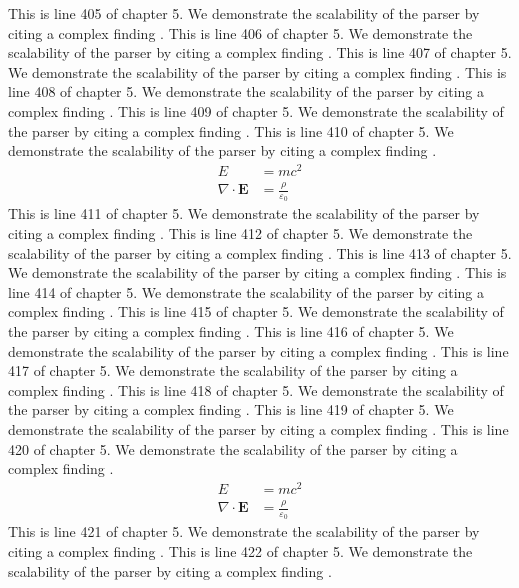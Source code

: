This is line 405 of chapter 5. We demonstrate the scalability of the parser by citing a complex finding \cite{ref5_405}.
This is line 406 of chapter 5. We demonstrate the scalability of the parser by citing a complex finding \cite{ref5_406}.
This is line 407 of chapter 5. We demonstrate the scalability of the parser by citing a complex finding \cite{ref5_407}.
This is line 408 of chapter 5. We demonstrate the scalability of the parser by citing a complex finding \cite{ref5_408}.
This is line 409 of chapter 5. We demonstrate the scalability of the parser by citing a complex finding \cite{ref5_409}.
This is line 410 of chapter 5. We demonstrate the scalability of the parser by citing a complex finding \cite{ref5_410}.
\begin{align*}
  E &= mc^2 \\
  \nabla \cdot \mathbf{E} &= \frac{\rho}{\varepsilon_0}
\end{align*}
This is line 411 of chapter 5. We demonstrate the scalability of the parser by citing a complex finding \cite{ref5_411}.
This is line 412 of chapter 5. We demonstrate the scalability of the parser by citing a complex finding \cite{ref5_412}.
This is line 413 of chapter 5. We demonstrate the scalability of the parser by citing a complex finding \cite{ref5_413}.
This is line 414 of chapter 5. We demonstrate the scalability of the parser by citing a complex finding \cite{ref5_414}.
This is line 415 of chapter 5. We demonstrate the scalability of the parser by citing a complex finding \cite{ref5_415}.
This is line 416 of chapter 5. We demonstrate the scalability of the parser by citing a complex finding \cite{ref5_416}.
This is line 417 of chapter 5. We demonstrate the scalability of the parser by citing a complex finding \cite{ref5_417}.
This is line 418 of chapter 5. We demonstrate the scalability of the parser by citing a complex finding \cite{ref5_418}.
This is line 419 of chapter 5. We demonstrate the scalability of the parser by citing a complex finding \cite{ref5_419}.
This is line 420 of chapter 5. We demonstrate the scalability of the parser by citing a complex finding \cite{ref5_420}.
\begin{align*}
  E &= mc^2 \\
  \nabla \cdot \mathbf{E} &= \frac{\rho}{\varepsilon_0}
\end{align*}
This is line 421 of chapter 5. We demonstrate the scalability of the parser by citing a complex finding \cite{ref5_421}.
This is line 422 of chapter 5. We demonstrate the scalability of the parser by citing a complex finding \cite{ref5_422}.
